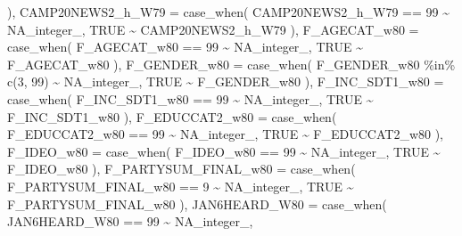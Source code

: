 \documentclass[
  letterpaper,
  DIV=11,
  numbers=noendperiod]{scrartcl}
\newenvironment{Shaded}{\begin{snugshade}}{\end{snugshade}}
\newcommand{\AttributeTok}[1]{\textcolor[rgb]{0.40,0.45,0.13}{#1}}
\newcommand{\ConstantTok}[1]{\textcolor[rgb]{0.56,0.35,0.01}{#1}}
\newcommand{\DecValTok}[1]{\textcolor[rgb]{0.68,0.00,0.00}{#1}}
\newcommand{\FunctionTok}[1]{\textcolor[rgb]{0.28,0.35,0.67}{#1}}
\newcommand{\NormalTok}[1]{\textcolor[rgb]{0.00,0.23,0.31}{#1}}
\newcommand{\SpecialCharTok}[1]{\textcolor[rgb]{0.37,0.37,0.37}{#1}}
\begin{document}
\begin{Shaded}
\begin{Highlighting}[]
\NormalTok{    ),}
    \AttributeTok{CAMP20NEWS2\_h\_W79 =} \FunctionTok{case\_when}\NormalTok{(}
\NormalTok{      CAMP20NEWS2\_h\_W79 }\SpecialCharTok{==} \DecValTok{99} \SpecialCharTok{\textasciitilde{}} \ConstantTok{NA\_integer\_}\NormalTok{,}
      \ConstantTok{TRUE} \SpecialCharTok{\textasciitilde{}}\NormalTok{ CAMP20NEWS2\_h\_W79}
\NormalTok{    ),}
    \AttributeTok{F\_AGECAT\_w80 =} \FunctionTok{case\_when}\NormalTok{(}
\NormalTok{      F\_AGECAT\_w80 }\SpecialCharTok{==} \DecValTok{99} \SpecialCharTok{\textasciitilde{}} \ConstantTok{NA\_integer\_}\NormalTok{,}
      \ConstantTok{TRUE} \SpecialCharTok{\textasciitilde{}}\NormalTok{ F\_AGECAT\_w80}
\NormalTok{    ),}
    \AttributeTok{F\_GENDER\_w80 =} \FunctionTok{case\_when}\NormalTok{(}
\NormalTok{  F\_GENDER\_w80 }\SpecialCharTok{\%in\%} \FunctionTok{c}\NormalTok{(}\DecValTok{3}\NormalTok{, }\DecValTok{99}\NormalTok{) }\SpecialCharTok{\textasciitilde{}} \ConstantTok{NA\_integer\_}\NormalTok{,}
  \ConstantTok{TRUE} \SpecialCharTok{\textasciitilde{}}\NormalTok{ F\_GENDER\_w80}
\NormalTok{    ),}
    \AttributeTok{F\_INC\_SDT1\_w80 =} \FunctionTok{case\_when}\NormalTok{(}
\NormalTok{      F\_INC\_SDT1\_w80 }\SpecialCharTok{==} \DecValTok{99} \SpecialCharTok{\textasciitilde{}} \ConstantTok{NA\_integer\_}\NormalTok{,}
      \ConstantTok{TRUE} \SpecialCharTok{\textasciitilde{}}\NormalTok{ F\_INC\_SDT1\_w80}
\NormalTok{    ),}
    \AttributeTok{F\_EDUCCAT2\_w80 =} \FunctionTok{case\_when}\NormalTok{(}
\NormalTok{      F\_EDUCCAT2\_w80 }\SpecialCharTok{==} \DecValTok{99} \SpecialCharTok{\textasciitilde{}} \ConstantTok{NA\_integer\_}\NormalTok{,}
      \ConstantTok{TRUE} \SpecialCharTok{\textasciitilde{}}\NormalTok{ F\_EDUCCAT2\_w80}
\NormalTok{    ),}
    \AttributeTok{F\_IDEO\_w80 =} \FunctionTok{case\_when}\NormalTok{(}
\NormalTok{      F\_IDEO\_w80 }\SpecialCharTok{==} \DecValTok{99} \SpecialCharTok{\textasciitilde{}} \ConstantTok{NA\_integer\_}\NormalTok{,}
      \ConstantTok{TRUE} \SpecialCharTok{\textasciitilde{}}\NormalTok{ F\_IDEO\_w80}
\NormalTok{    ),}
    \AttributeTok{F\_PARTYSUM\_FINAL\_w80 =} \FunctionTok{case\_when}\NormalTok{(}
\NormalTok{      F\_PARTYSUM\_FINAL\_w80 }\SpecialCharTok{==} \DecValTok{9} \SpecialCharTok{\textasciitilde{}} \ConstantTok{NA\_integer\_}\NormalTok{,}
      \ConstantTok{TRUE} \SpecialCharTok{\textasciitilde{}}\NormalTok{ F\_PARTYSUM\_FINAL\_w80}
\NormalTok{    ),}
    \AttributeTok{JAN6HEARD\_W80 =} \FunctionTok{case\_when}\NormalTok{(}
\NormalTok{      JAN6HEARD\_W80 }\SpecialCharTok{==} \DecValTok{99} \SpecialCharTok{\textasciitilde{}} \ConstantTok{NA\_integer\_}\NormalTok{,}

\end{Highlighting}
\end{Shaded}
\end{document}
